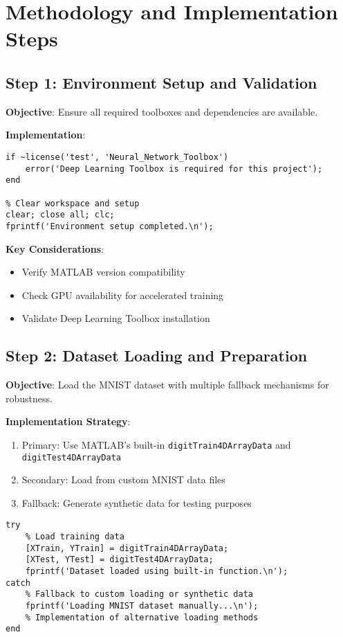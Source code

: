 \documentclass[12pt,a4paper]{article}
\begin{document}
\section{Methodology and Implementation Steps}

\subsection{Step 1: Environment Setup and Validation}

\textbf{Objective}: Ensure all required toolboxes and dependencies are available.

\textbf{Implementation}:
\begin{lstlisting}[caption=Environment Setup]
% Check for Deep Learning Toolbox
if ~license('test', 'Neural_Network_Toolbox')
    error('Deep Learning Toolbox is required for this project');
end

% Clear workspace and setup
clear; close all; clc;
fprintf('Environment setup completed.\n');
\end{lstlisting}

\textbf{Key Considerations}:
\begin{itemize}
    \item Verify MATLAB version compatibility
    \item Check GPU availability for accelerated training
    \item Validate Deep Learning Toolbox installation
\end{itemize}

\subsection{Step 2: Dataset Loading and Preparation}

\textbf{Objective}: Load the MNIST dataset with multiple fallback mechanisms for robustness.

\textbf{Implementation Strategy}:
\begin{enumerate}
    \item Primary: Use MATLAB's built-in \texttt{digitTrain4DArrayData} and \texttt{digitTest4DArrayData}
    \item Secondary: Load from custom MNIST data files
    \item Fallback: Generate synthetic data for testing purposes
\end{enumerate}

\begin{lstlisting}[caption=Dataset Loading with Fallback]
try
    % Load training data
    [XTrain, YTrain] = digitTrain4DArrayData;
    [XTest, YTest] = digitTest4DArrayData;
    fprintf('Dataset loaded using built-in function.\n');
catch
    % Fallback to custom loading or synthetic data
    fprintf('Loading MNIST dataset manually...\n');
    % Implementation of alternative loading methods
end
\end{lstlisting}
\end{document}
